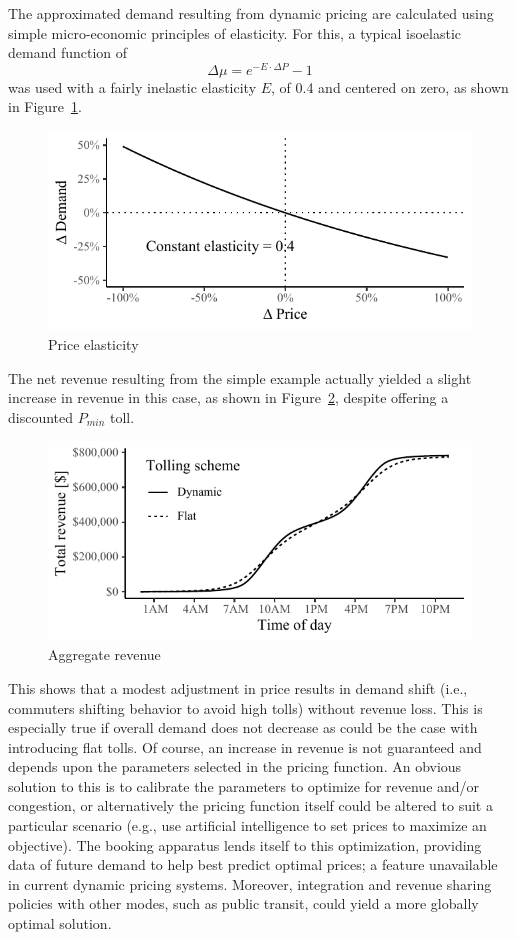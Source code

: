 \documentclass{article}
\begin{document}
The approximated demand resulting from dynamic pricing are calculated using simple micro-economic principles of elasticity. For this, a typical isoelastic demand function of
  \begin{equation}
 \Delta\mu = e^{-E \cdot \Delta P} - 1
 \end{equation} 
 was used with a fairly inelastic elasticity $E$, of 0.4 and centered on zero, as shown in Figure~\ref{fig:toyelasticity}.
  
  \begin{figure}[h]
 	\centering
 	\includegraphics[width=0.75\linewidth]{figures/toyelasticity}
 	\caption{Price elasticity}
 	\label{fig:toyelasticity}
 \end{figure}
 
  
The net revenue resulting from the simple example actually yielded a slight increase in revenue in this case, as shown in Figure~\ref{fig:toyrevenue}, despite offering a discounted $P_{min}$ toll.
 
 \begin{figure}[h]
 	\centering
 	\includegraphics[width=0.75\linewidth]{figures/toyrevenue}
 	\caption{Aggregate revenue}
 	\label{fig:toyrevenue}
 \end{figure}
 
This shows that a modest adjustment in price results in demand shift (i.e., commuters shifting behavior to avoid high tolls) without revenue loss. This is especially true if overall demand does not decrease as could be the case with introducing flat tolls. Of course, an increase in revenue is not guaranteed and depends upon the parameters selected in the pricing function. An obvious solution to this is to calibrate the parameters to optimize for revenue and/or congestion, or alternatively the pricing function itself could be altered to suit a particular scenario (e.g., use artificial intelligence to set prices to maximize an objective). The booking apparatus lends itself to this optimization, providing data of future demand to help best predict optimal prices; a feature unavailable in current dynamic pricing systems. Moreover, integration and revenue sharing policies with other modes, such as public transit, could yield a more globally optimal solution. 
\end{document}
